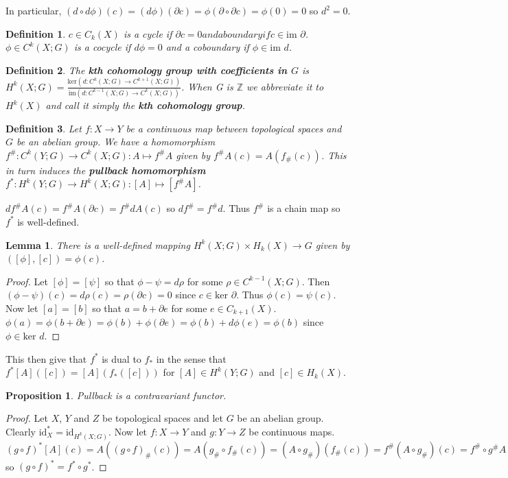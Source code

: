 \documentclass{report}
\newtheorem{definition}{Definition}
\newtheorem{lemma}{Lemma}
\newtheorem{proposition}{Proposition}
\begin{document}
\noindent In particular, $(d\circ d\phi)(c)=(d\phi)(\partial c)=\phi(\partial\circ\partial c)=\phi(0)=0$ so $d^2=0$.

\begin{definition}
$c\in C_k(X)$ is a cycle if $\partial c=0 and a boundary if c\in\text{im }\partial$.
$\phi\in C^k(X;G)$ is a cocycle if $d\phi=0$ and a coboundary if $\phi\in\text{im }d$.
\end{definition}

\begin{definition}
The \textbf{kth cohomology group with coefficients in $G$} is $H^k(X;G)=\frac{\text{ker}(d\colon C^k(X;G)\to C^{k+1}(X;G))}{\text{im}(d\colon C^{k-1}(X;G)\to C^k(X;G))}$. When G is $\mathbb{Z}$ we abbreviate it to $H^k(X)$ and call it simply the \textbf{kth cohomology group}.
\end{definition}

\begin{definition}
Let $f\colon X\to Y$ be a continuous map between topological spaces and $G$ be an abelian group. We have a homomorphism $f^\#\colon C^k(Y;G)\to C^k(X;G):A\mapsto f^\# A$ given by $f^\# A(c)=A(f_\#(c))$. This in turn induces the \textbf{pullback homomorphism} $f^*\colon H^k(Y;G)\to H^k(X;G):[A]\mapsto [f^\# A]$.
\end{definition}
\noindent $df^\# A(c)=f^\# A(\partial c)=f^\# dA(c)$ so $df^\#=f^\# d$. Thus $f^\#$ is a chain map so $f^*$ is well-defined.

\begin{lemma}
There is a well-defined mapping $H^k(X;G)\times H_k(X)\to G$ given by $([\phi],[c])=\phi(c)$.
\end{lemma}
\begin{proof}
Let $[\phi]=[\psi]$ so that $\phi-\psi=d\rho$ for some $\rho\in C^{k-1}(X;G)$. Then $(\phi-\psi)(c)=d\rho(c)=\rho(\partial c)=0$ since $c\in\text{ker }\partial$. Thus $\phi(c)=\psi(c)$.
Now let $[a]=[b]$ so that $a=b+\partial e$ for some $e\in C_{k+1}(X)$. $\phi(a)=\phi(b+\partial e)=\phi(b)+\phi(\partial e)=\phi(b)+d\phi(e)=\phi(b)$ since $\phi\in\text{ker }d$.
\end{proof}

\noindent This then give that $f^*$ is dual to $f_*$ in the sense that $f^*[A]([c])=[A](f_*([c]))$ for $[A]\in H^k(Y;G)$ and $[c]\in H_k(X)$.

\begin{proposition}
Pullback is a contravariant functor.
\end{proposition}
\begin{proof}
Let $X$, $Y$ and $Z$ be topological spaces and let $G$ be an abelian group. 
Clearly $\text{id}_X^*=\text{id}_{H^k(X;G)}$.
Now let $f\colon X\to Y$ and $g\colon Y\to Z$ be continuous maps. $(g\circ f)^*[A](c)=A((g\circ f)_\#(c))=A(g_\#\circ f_\#(c))=(A\circ g_\#)(f_\#(c))=f^\#(A\circ g_\#)(c)=f^\#\circ g^\#A(c)=[f^\#\circ g^\# A](c)=f^*[g^\#A](c)=(f^*\circ g^*)[A](c)\forall [c]\in H_k(X)$ so $(g\circ f)^*=f^*\circ g^*$.
\end{proof}
\end{document}
